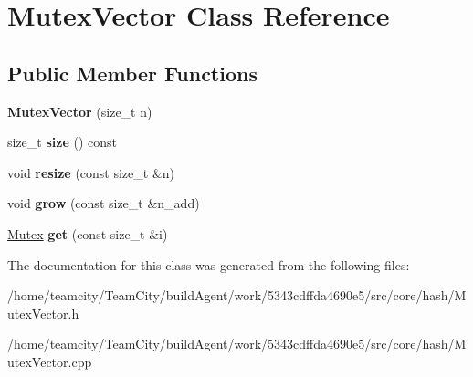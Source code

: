 \hypertarget{classMutexVector}{}\section{Mutex\+Vector Class Reference}
\label{classMutexVector}
\subsection*{Public Member Functions}
\begin{DoxyCompactItemize}
\item 
{\bfseries Mutex\+Vector} (size\+\_\+t n)\hypertarget{classMutexVector_a5d300485937637d11c5a25291d764b61}{}\label{classMutexVector_a5d300485937637d11c5a25291d764b61}

\item 
size\+\_\+t {\bfseries size} () const \hypertarget{classMutexVector_ab909cd467d1fd9db202d19c0fd289b5c}{}\label{classMutexVector_ab909cd467d1fd9db202d19c0fd289b5c}

\item 
void {\bfseries resize} (const size\+\_\+t \&n)\hypertarget{classMutexVector_ab0542e59bb6f5d5f719a0f409e14fc4b}{}\label{classMutexVector_ab0542e59bb6f5d5f719a0f409e14fc4b}

\item 
void {\bfseries grow} (const size\+\_\+t \&n\+\_\+add)\hypertarget{classMutexVector_a4676b810af4089339490d180d70bad70}{}\label{classMutexVector_a4676b810af4089339490d180d70bad70}

\item 
\hyperlink{classMutex}{Mutex} {\bfseries get} (const size\+\_\+t \&i)\hypertarget{classMutexVector_add90db2f59a9aaf481227ef5e56d715c}{}\label{classMutexVector_add90db2f59a9aaf481227ef5e56d715c}

\end{DoxyCompactItemize}


The documentation for this class was generated from the following files\+:\begin{DoxyCompactItemize}
\item 
/home/teamcity/\+Team\+City/build\+Agent/work/5343cdffda4690e5/src/core/hash/Mutex\+Vector.\+h\item 
/home/teamcity/\+Team\+City/build\+Agent/work/5343cdffda4690e5/src/core/hash/Mutex\+Vector.\+cpp\end{DoxyCompactItemize}
